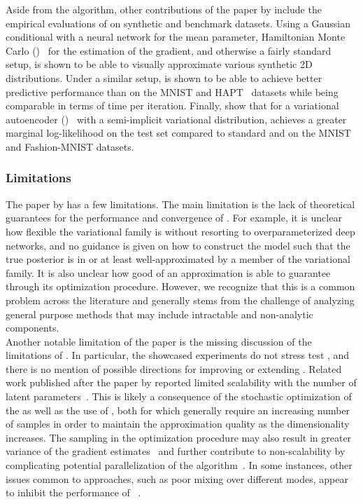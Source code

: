 \documentclass[10pt]{article}
\begin{document}
Aside from the \uivi algorithm, other contributions of the paper by \citet{Titsias:2019} include the empirical evaluations of \uivi on synthetic and benchmark datasets. Using a Gaussian conditional with a neural network for the mean parameter, Hamiltonian Monte Carlo (\hmc)~\citep{Neal:2011} for the \mcmc estimation of the \elbo gradient, and otherwise a fairly standard setup, \uivi is shown to be able to visually approximate various synthetic 2D distributions. Under a similar setup, \uivi is shown to be able to achieve better predictive performance than \sivi on the MNIST and HAPT~\citep{Reyes:2014} datasets while being comparable in terms of time per iteration. Finally, \citet{Titsias:2019} show that for a variational autoencoder (\vae)~\citep{Kingma:2013} with a semi-implicit variational distribution, \uivi achieves a greater marginal log-likelihood on the test set compared to standard \vae and \sivi on the MNIST and Fashion-MNIST datasets.

\subsubsection{Limitations}

The paper by \citet{Titsias:2019} has a few limitations. The main limitation is the lack of theoretical guarantees for the performance and convergence of \uivi. For example, it is unclear how flexible the \uivi variational family is without resorting to overparameterized deep networks, and no guidance is given on how to construct the model such that the true posterior is in or at least well-approximated by a member of the variational family. It is also unclear how good of an approximation \uivi is able to guarantee through its optimization procedure. However, we recognize that this is a common problem across the \vi literature and generally stems from the challenge of analyzing general purpose methods that may include intractable and non-analytic components.
\\

Another notable limitation of the paper is the missing discussion of the limitations of \uivi. In particular, the showcased experiments do not stress test \uivi, and there is no mention of possible directions for improving or extending \uivi. Related work published after the paper by \citet{Titsias:2019} reported limited scalability with the number of latent parameters~\citep{Molchanova:2019,Moens:2021}. This is likely a consequence of the stochastic optimization of the \elbo as well as the use of \mcmc, both for which generally require an increasing number of samples in order to maintain the approximation quality as the dimensionality increases. The \mcmc sampling in the \uivi optimization procedure may also result in greater variance of the \elbo gradient estimates~\citep{Betancourt:2015} and further contribute to non-scalability by complicating potential parallelization of the algorithm~\citep{Sobolev:2019}. In some instances, other issues common to \mcmc approaches, such as poor mixing over different modes, appear to inhibit the performance of \uivi~\citep{Sobolev:2019}.
\end{document}
